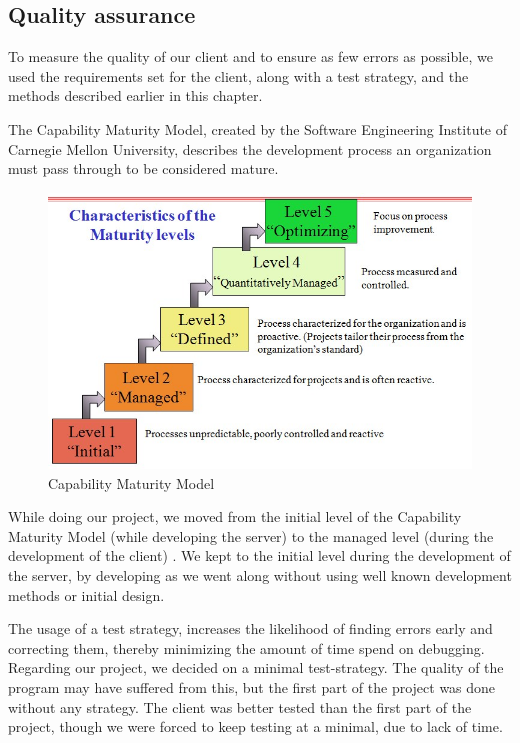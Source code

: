 \subsection{Quality assurance}
To measure the quality of our client and to ensure as few errors as possible, we used the requirements set for the client, along with a test strategy, and the methods described earlier in this chapter.

 The Capability Maturity Model, created by the Software Engineering Institute of Carnegie Mellon University, describes the development process an organization must pass through to be considered mature.
\begin{figure}[H]
 \includegraphics[width=\textwidth]{illustrations/CMM.jpg}
  \caption{Capability Maturity Model}
  \label{Capability_Maturity_Model}
\end{figure}

While doing our project, we moved from the initial level of the Capability Maturity Model (while developing the server) to the managed level (during the development of the client) \cite[p. 242]{PM}. We kept to the initial level during the development of the server, by developing as we went along without using well known development methods or initial design.

The usage of a test strategy, increases the likelihood of finding errors early and correcting them, thereby minimizing the amount of time spend on debugging.
Regarding our project, we decided on a minimal test-strategy. The quality of the program may have suffered from this, but the first part of the project was done without any strategy. The client was better tested than the first part of the project, though we were forced to keep testing at a minimal, due to lack of time.

